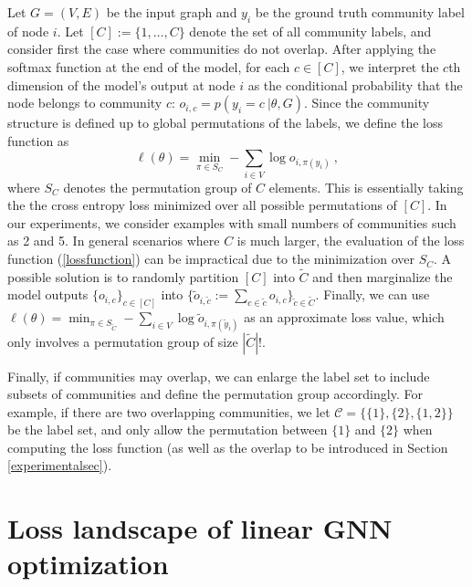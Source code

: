 \documentclass{article} \usepackage{iclr2019_conference,times}
\begin{document}
Let $G=(V,E)$ be the input graph and $y_i$ be the ground truth 
community label of node $i$. Let $[C]:=\{1, \dots, C\}$ denote the set of all community labels, and consider first the case where 
communities do not overlap.
After applying the softmax function at the end of the model, for each $c \in [C]$, we interpret the $c$th dimension of the model's output at node $i$ as the conditional probability that the node belongs to community $c$: $o_{i, c} = p(y_i = c~|\theta,G)$. Since the community structure is defined up to global permutations of the labels, we define the loss function as
\begin{equation}
\label{lossfunction}
\ell( \theta ) =  \min_{ \pi \in S_{C}} - \sum_{i \in V} \log o_{i, \pi(y_i)}~,
\end{equation}
where $S_{C}$ denotes the permutation group of $C$ elements. This is essentially taking the the cross entropy loss minimized over all possible permutations of $[C]$.
In our experiments, we consider examples with small numbers of 
communities such as 2 and 5. In general scenarios where $C$ is much larger, the evaluation of the loss function (\ref{lossfunction}) can be impractical due to the minimization over $S_{C}$. A possible solution is to randomly partition $[C]$ into $\tilde{C}$ and then marginalize the model outputs $\{ o_{i,c} \}_{c \in [C]}$ into 
$\{ \tilde{o}_{i, \tilde{c}} := \sum_{c \in \tilde{c}} o_{i,c} \}_{\tilde{c} \in \tilde{C}}$. Finally, we can use 
$\ell( \theta ) =  \min_{ \pi \in S_{\tilde{C}}} - \sum_{i \in V} \log \tilde{o}_{i, \pi(\tilde{y}_i)}$ as an approximate loss value, which only involves a permutation group of size $|\tilde{C}|!$.


Finally, if communities may overlap, 
we can enlarge the label set to include subsets of communities and define the permutation group accordingly. For example, if there are two overlapping communities, we let $\mathcal{C} = \{\{1\}, \{2\}, \{1, 2\}\}$ be the label set, and only allow the permutation between $\{1\}$ and $\{2\}$ when computing the loss function (as well as the overlap to be introduced in Section \ref{experimentalsec}).






%
 
\section{Loss landscape of linear GNN optimization}
\label{landscapesec}
\end{document}
